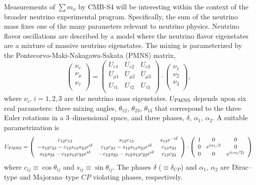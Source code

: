 Measurements of $ \sum m_\nu $ by CMB-S4 will be interesting within the context of the broader neutrino experimental program. Specifically, the sum of the neutrino mass fixes one of the many parameters relevant to neutrino physics.  Neutrino flavor oscillations are described by a model where the neutrino flavor eigenstates are a mixture of massive neutrino eigenstates. The mixing is parameterized by the Pontecorvo-Maki-Nakagawa-Sakata (PMNS) matrix,
\[ \left( \begin{array}{c} \nu_e \\ \nu_{\mu} \\ \nu_{\tau} \\ \end{array} \right) = 
\left( \begin{array}{ccc} U_{e1} & U_{e2} & U_{e3} \\ U_{\mu1} & U_{\mu2} & U_{\mu3} \\ U_{\tau1} & U_{\tau2} & U_{\tau3} \\
\end{array} \right) \cdot
\left( \begin{array}{c} \nu_1 \\ \nu_2 \\ \nu_3 \\ \end{array} \right),
\]
where $\nu_{i}$, $i=1,2,3$ are the neutrino mass eigenstates. $U_{\rm PMNS}$ depends upon six real parameters: three mixing angles, $\theta_{12}$,  $\theta_{23}$, $\theta_{13}$ that
correspond to the three Euler rotations in a 3--dimensional space, and three phases, $\delta$, $\alpha_1$, $\alpha_2$. A suitable parametrization is
\[ U_{\rm PMNS}=
\left( \begin{array}{ccc} c_{12}c_{13} & s_{12}c_{13} & s_{13} e^{-i\delta} \\ 
-s_{12}c_{23} - c_{12}s_{13}s_{23} e^{i\delta} & c_{12}c_{23} - s_{12}s_{13}s_{23} e^{i\delta} & c_{13}s_{23} \\
s_{12}s_{23} - c_{12}s_{13}c_{23} e^{i\delta} & -c_{12}s_{23} - s_{12}s_{13}c_{23} e^{i\delta} & c_{13}c_{23} \\
\end{array} \right) \cdot
\left( \begin{array}{ccc} 1 & 0 & 0 \\ 0 & e^{i\alpha_1/2} & 0 \\ 0 & 0 & e^{i(\alpha_2/2)} \\ 
\end{array} \right)
\]
where $c_{ij} \equiv \cos\theta_{ij}$ and $s_{ij} \equiv \sin\theta_{ij}$. 
The phases $\delta$ ($\equiv \delta_{CP}$) and $\alpha_1$, $\alpha_2$ are Dirac--type and Majorana--type $CP$ violating phases, respectively.

